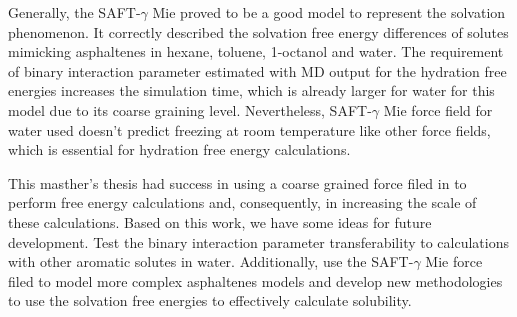 Generally, the SAFT-$\gamma$ Mie proved to be a good model to represent the solvation phenomenon. It correctly described the solvation free energy differences of solutes mimicking asphaltenes in hexane, toluene, 1-octanol and water. The requirement of binary interaction parameter estimated with MD  output for the hydration free energies increases the simulation time, which is already larger for water for this model due to its coarse graining level. Nevertheless, SAFT-$\gamma$ Mie force field for water used doesn't predict freezing at room temperature like other force fields, which is essential for hydration free energy calculations.

This masther's thesis had success in using a coarse grained force filed in to perform free energy calculations and, consequently, in increasing the scale of these calculations. Based on this work, we have some ideas for future development. Test the binary interaction parameter transferability to calculations with other aromatic solutes in water. Additionally, use the SAFT-$\gamma$ Mie force filed to model more complex asphaltenes models and develop new methodologies to use the solvation free energies to effectively calculate solubility. 
 


